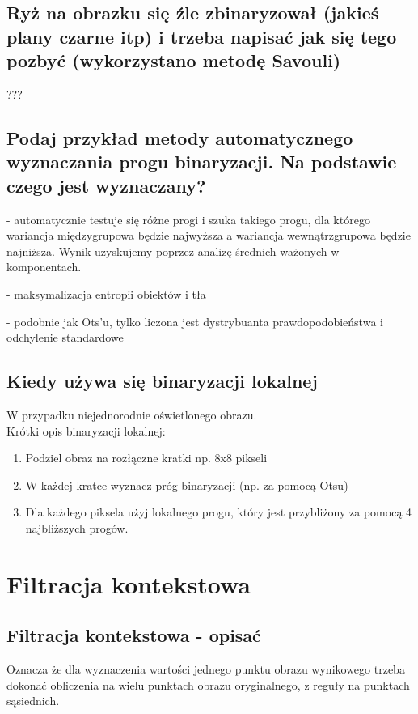 \documentclass[a4paper, 12pt, titlepage]{article}
\begin{document}
\subsection{Ryż na obrazku się źle zbinaryzował (jakieś plany czarne itp) i trzeba napisać jak się tego pozbyć (wykorzystano metodę Savouli)}
???

\subsection{Podaj przykład metody automatycznego wyznaczania progu binaryzacji. Na podstawie czego jest wyznaczany?}
\begin{description}[noitemsep]
	\item[Ots'u] - automatycznie testuje się różne progi i szuka takiego progu, dla którego wariancja międzygrupowa będzie najwyższa a wariancja wewnątrzgrupowa będzie najniższa. Wynik uzyskujemy poprzez analizę średnich ważonych w komponentach.
	\item[Yen] - maksymalizacja entropii obiektów i tła
	\item[Kittler] - podobnie jak Ots'u, tylko liczona jest dystrybuanta prawdopodobieństwa i odchylenie	standardowe

\end{description}

\subsection{Kiedy używa się binaryzacji lokalnej}
W przypadku niejednorodnie oświetlonego obrazu.\\
Krótki opis binaryzacji lokalnej:
\begin{enumerate}[noitemsep]
	\item Podziel obraz na rozłączne kratki np. 8x8 pikseli
	\item W każdej kratce wyznacz próg binaryzacji (np. za pomocą Otsu)
	\item Dla każdego piksela użyj lokalnego progu, który jest przybliżony za pomocą 4 najbliższych progów.
\end{enumerate}
\pagebreak\section{Filtracja kontekstowa}

\subsection{Filtracja kontekstowa - opisać}
Oznacza że dla wyznaczenia wartości jednego punktu obrazu wynikowego trzeba dokonać obliczenia na wielu punktach obrazu oryginalnego, z reguły na punktach sąsiednich.
\end{document}
